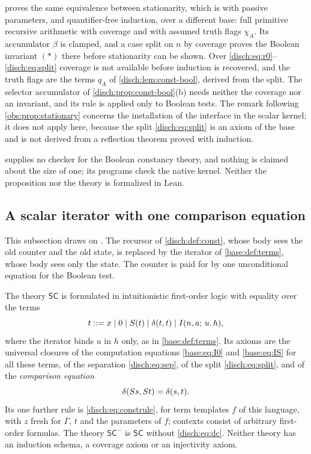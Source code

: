 \begin{remark}
\label{disch:rem:const-stationary}
 proves the same equivalence between
stationarity, which is  with passive parameters, and
quantifier-free induction, over a different base: full primitive recursive
arithmetic with coverage and with assumed truth flags $\chi_A$. Its
accumulator $\beta$ is clamped, and a case split on $n$ by coverage proves
the Boolean invariant $(*)$ there before stationarity can be shown. Over
\eqref{disch:eq:r0}--\eqref{disch:eq:split} coverage is not available
before induction is recovered, and the truth flags are the terms $q_A$ of
\cref{disch:lem:const-bool}, derived from the split. The selector
accumulator of \cref{disch:prop:const-bool}(b) needs neither the coverage
nor an invariant, and its rule is applied only to Boolean tests. The
remark following \cref{obs:prop:stationary} concerns the installation of
the interface in the scalar kernel; it does not apply here, because the
split \eqref{disch:eq:split} is an axiom of the base and is not derived
from a reflection theorem proved with induction.
\end{remark}

 supplies no checker for the Boolean constancy
theory, and nothing is claimed about the size of one; its programs check
the native kernel. Neither the proposition nor the theory is formalized in
Lean.

\subsection{A scalar iterator with one comparison equation}
\label{disch:sec:scalar-const}

This subsection draws on . The recursor of
\cref{disch:def:const}, whose body sees the old counter and the old state,
is replaced by the iterator of \cref{base:def:terms}, whose body sees only
the state. The counter is paid for by one unconditional equation for the
Boolean test.

\begin{definition}
\label{disch:def:sc}
The theory $\mathsf{SC}$ is formulated in intuitionistic first-order logic
with equality over the terms
\[
 t::=x\mid 0\mid S(t)\mid\delta(t,t)\mid I(n,a;\,u.\,h),
\]
where the iterator binds $u$ in $h$ only, as in \cref{base:def:terms}. Its
axioms are the universal closures of the computation equations
\eqref{base:eq:I0} and \eqref{base:eq:IS} for all these terms, of the
separation \eqref{disch:eq:sep}, of the split \eqref{disch:eq:split}, and of
the \emph{comparison equation}
\begin{equation}
 \delta(S s,S t)=\delta(s,t).
 \label{disch:eq:dc}
\end{equation}
Its one further rule is  \eqref{disch:eq:construle}, for term
templates $f$ of this language, with $z$ fresh for $\Gamma$, $t$ and the
parameters of $f$; contexts consist of arbitrary first-order formulas. The
theory $\mathsf{SC}^{-}$ is $\mathsf{SC}$ without \eqref{disch:eq:dc}.
Neither theory has an induction schema, a coverage axiom or an injectivity
axiom.
\end{definition}

